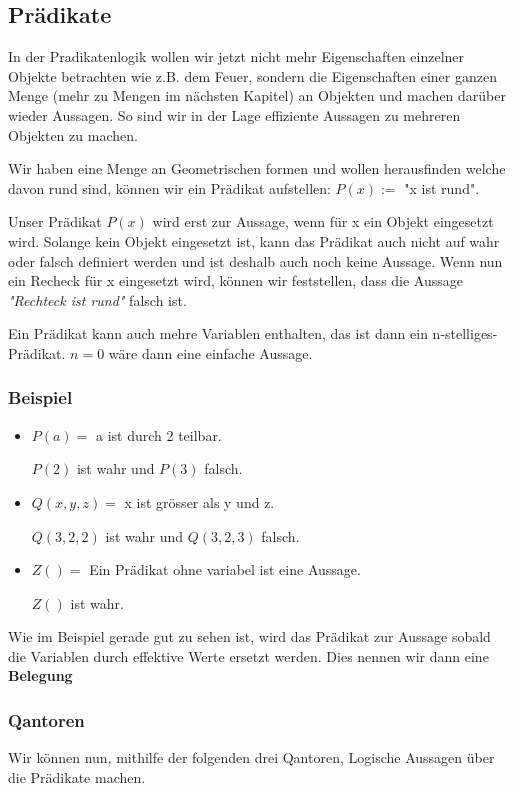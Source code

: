 \documentclass[a4paper,12pt]{article}
\begin{document}
\subsection{Prädikate}
In der Pradikatenlogik wollen wir jetzt nicht mehr Eigenschaften einzelner Objekte betrachten wie z.B. dem Feuer,
sondern die Eigenschaften einer ganzen Menge (mehr zu Mengen im nächsten Kapitel) an Objekten und machen darüber wieder Aussagen. So sind wir in der Lage effiziente Aussagen zu mehreren Objekten zu machen.

Wir haben eine Menge an Geometrischen formen und wollen herausfinden welche davon rund sind, können wir ein Prädikat aufstellen: \( P(x) := \) "x ist rund".


Unser Prädikat \( P(x) \) wird erst zur Aussage, wenn für x ein Objekt eingesetzt wird. Solange kein Objekt eingesetzt ist, kann das Prädikat auch nicht auf wahr oder falsch definiert werden und ist deshalb auch noch keine Aussage. Wenn nun ein Recheck für x eingesetzt wird, können wir feststellen, dass die Aussage \textit{"Rechteck ist rund"} falsch ist.

Ein Prädikat kann auch mehre Variablen enthalten, das ist dann ein n-stelliges-Prädikat. \( n = 0 \) wäre dann eine einfache Aussage.


\subsubsection*{Beispiel}
\begin{itemize}
  \item \(P(a) = \)  a ist durch 2 teilbar.
 
  \(P(2) \) ist wahr und \(P(3)\) falsch.
  \item \(Q(x, y, z) = \) x ist grösser als y und z.
 
  \(Q(3, 2, 2) \) ist wahr und \(Q(3, 2, 3)\) falsch.
  \item \(Z() = \) Ein Prädikat ohne variabel ist eine Aussage.
 
  \(Z() \) ist wahr.
\end{itemize}

Wie im Beispiel gerade gut zu sehen ist, wird das Prädikat zur Aussage sobald die Variablen durch effektive Werte ersetzt werden. Dies nennen wir dann eine \textbf{Belegung}
\newpage
\subsubsection{Qantoren}
Wir können nun, mithilfe der folgenden drei Qantoren, Logische Aussagen über die Prädikate machen.
\end{document}
